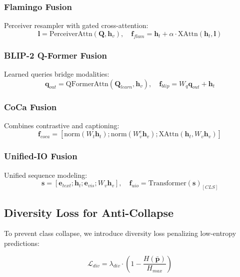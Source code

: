 \documentclass[journal]{IEEEtran}
\begin{document}
\subsubsection{Flamingo Fusion}
Perceiver resampler with gated cross-attention:
\begin{equation}
\mathbf{l} = \text{PerceiverAttn}(\mathbf{Q}, \mathbf{h}_v), \quad \mathbf{f}_{flam} = \mathbf{h}_t + \alpha \cdot \text{XAttn}(\mathbf{h}_t, \mathbf{l})
\end{equation}

\subsubsection{BLIP-2 Q-Former Fusion}
Learned queries bridge modalities:
\begin{equation}
\mathbf{q}_{out} = \text{QFormerAttn}(\mathbf{Q}_{learn}, \mathbf{h}_v), \quad \mathbf{f}_{blip} = W_q\mathbf{q}_{out} + \mathbf{h}_t
\end{equation}

\subsubsection{CoCa Fusion}
Combines contrastive and captioning:
\begin{equation}
\mathbf{f}_{coca} = [\text{norm}(W_t\mathbf{h}_t); \text{norm}(W_v^c\mathbf{h}_v); \text{XAttn}(\mathbf{h}_t, W_v\mathbf{h}_v)]
\end{equation}

\subsubsection{Unified-IO Fusion}
Unified sequence modeling:
\begin{equation}
\mathbf{s} = [\mathbf{e}_{text}; \mathbf{h}_t; \mathbf{e}_{vis}; W_v\mathbf{h}_v], \quad \mathbf{f}_{uio} = \text{Transformer}(\mathbf{s})_{[CLS]}
\end{equation}

\subsection{Diversity Loss for Anti-Collapse}

To prevent class collapse, we introduce diversity loss penalizing low-entropy predictions:

\begin{equation}
\mathcal{L}_{div} = \lambda_{div} \cdot \left(1 - \frac{H(\bar{\mathbf{p}})}{H_{max}}\right)
\end{equation}
\end{document}
